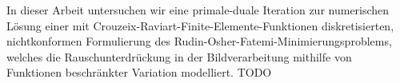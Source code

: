 In dieser Arbeit untersuchen wir eine primale-duale Iteration zur numerischen
Lösung einer mit Crouzeix\--Raviart\--Finite\--Elemente\--Funktionen
diskretisierten, nichtkonformen Formulierung des
Rudin\--Osher\--Fatemi\--Mi\-ni\-mie\-rungs\-problems, welches die
Rauschunterdrückung in der Bildverarbeitung mithilfe von Funktionen
beschränkter Variation modelliert.
TODO



